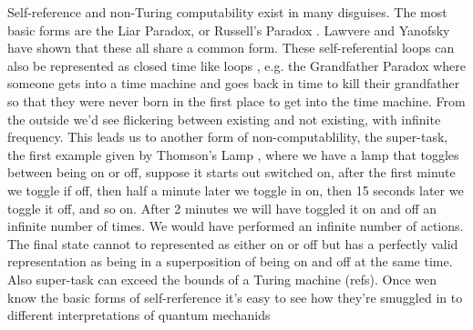 \documentclass{article}
\begin{document}
Self-reference and non-Turing computability exist in many disguises. The most basic forms are the Liar Paradox,  or Russell's Paradox . Lawvere \autocite{Lawvere1969DiagonalCategories} and Yanofsky \autocite{Yanofsky2003} have shown that these all share a common form. These self-referential loops can also be represented as closed time like loops , e.g. the Grandfather Paradox where someone gets into a time machine and goes back in time to kill their grandfather so that they were never born in the first place to get into the time machine. From the outside we'd see flickering between existing and not existing, with infinite frequency. This leads us to another form of non-computablility, the super-task, the first example given by Thomson's Lamp \autocite{Svozil2009}, where we have a lamp that toggles between being on or off, suppose it starts out switched on, after the first minute we toggle if off, then half a minute later we toggle in on, then 15 seconds later we toggle it off, and so on. After 2 minutes we will have toggled it on and off an infinite number of times. We would have performed an infinite number of actions. The final state cannot to represented as either on or off but has a perfectly valid representation as being in a superposition of being on and off at the same time. Also super-task can exceed the bounds of a Turing machine (refs). Once wen know the basic forms of self-rerference it's easy to see how they're smuggled in to different interpretations of quantum mechanids
\end{document}

